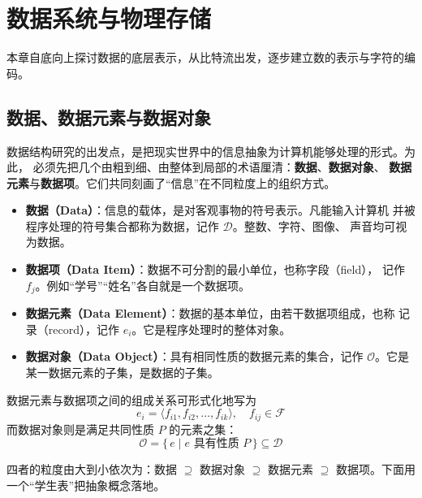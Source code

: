 \clearpage
\begingroup
\let\clearpage\relax
\let\cleardoublepage\relax
\vspace*{\fill}
\chapter{数据系统与物理存储}
\begin{center}
本章自底向上探讨数据的底层表示，从比特流出发，逐步建立数的表示与字符的编码。
\end{center}
\vspace*{\fill}
\endgroup
\clearpage


\section{数据、数据元素与数据对象}

数据结构研究的出发点，是把现实世界中的信息抽象为计算机能够处理的形式。为此，
必须先把几个由粗到细、由整体到局部的术语厘清：\textbf{数据}、\textbf{数据对象}、
\textbf{数据元素}与\textbf{数据项}。它们共同刻画了“信息”在不同粒度上的组织方式。

\begin{itemize}
    \item \textbf{数据（Data）}：信息的载体，是对客观事物的符号表示。凡能输入计算机
          并被程序处理的符号集合都称为数据，记作 $\mathcal{D}$。整数、字符、图像、
          声音均可视为数据。
    \item \textbf{数据项（Data Item）}：数据不可分割的最小单位，也称字段（field），
          记作 $f_j$。例如“学号”“姓名”各自就是一个数据项。
    \item \textbf{数据元素（Data Element）}：数据的基本单位，由若干数据项组成，也称
          记录（record），记作 $e_i$。它是程序处理时的整体对象。
    \item \textbf{数据对象（Data Object）}：具有相同性质的数据元素的集合，记作
          $\mathcal{O}$。它是某一数据元素的子集，是数据的子集。
\end{itemize}

数据元素与数据项之间的组成关系可形式化地写为
$$e_i = \langle f_{i1}, f_{i2}, \dots, f_{ik} \rangle, \quad f_{ij} \in \mathcal{F}$$
而数据对象则是满足共同性质 $P$ 的元素之集：
$$\mathcal{O} = \{\, e \mid e \text{ 具有性质 } P \,\} \subseteq \mathcal{D}$$

四者的粒度由大到小依次为：数据 $\supseteq$ 数据对象 $\supseteq$ 数据元素
$\supseteq$ 数据项。下面用一个“学生表”把抽象概念落地。

